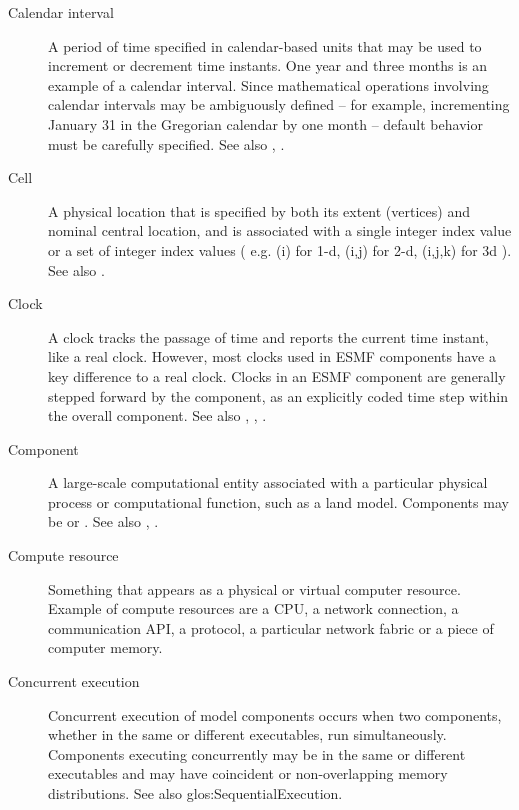 \begin{description}
\item[Calendar interval] \label{glos:CalInt} A period of time specified
  in calendar-based units that may be used to increment or decrement time instants.  
  One year and three months is an example of a calendar interval.  Since 
  mathematical operations involving calendar intervals may be ambiguously 
  defined -- for example, incrementing January 31 in the Gregorian calendar by 
  one month -- default behavior must be carefully specified.  
  See also , .

\item[Cell] \label{glos:Cell} A physical location that is specified by both 
  its extent (vertices) and nominal central location, and is associated with 
  a single integer index value or a set of integer index values ( e.g.
  (i) for 1-d, (i,j) for 2-d, (i,j,k) for 3d ). 
  See also .

\item[Clock] \label{glos:Clock} A clock tracks the passage of time and 
  reports the current time instant, like a real clock.  However, most clocks 
  used in ESMF components have a key difference to a real clock. Clocks 
  in an ESMF component are generally stepped forward by the component, as an 
  explicitly coded time step within the overall component.
  See also , 
  , .

\item[Component] \label{glos:Component} A large-scale computational entity 
  associated with a particular physical process or computational function, 
  such as a land model.  Components may be  
  or .  
  See also , 
  .

\item[Compute resource] \label{glos:CompResource} Something that appears as a
  physical or virtual computer resource. Example of compute resources
  are a CPU, a network connection, a communication API, a protocol, a 
  particular network fabric or a piece of computer memory. 

\item[Concurrent execution] \label{glos:ConcurrentExecution} 
  Concurrent execution of model components occurs when two components,
  whether in the same or different executables, run simultaneously.
  Components executing concurrently may be in the same or different 
  executables and may have coincident or non-overlapping memory 
  distributions.  See also 
  {glos:SequentialExecution}.


\end{description}

